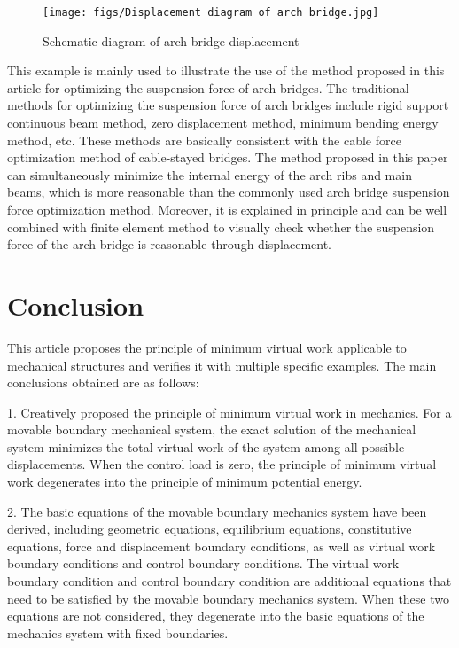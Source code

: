 \begin{figure}[h!] %
    \centering
    \texttt{[image: figs/Displacement diagram of arch bridge.jpg]} 
    \caption{Schematic diagram of arch bridge displacement}
    \label{fig:number}
\end{figure}
This example is mainly used to illustrate the use of the method proposed in this article for optimizing the suspension force of arch bridges. The traditional methods for optimizing the suspension force of arch bridges include rigid support continuous beam method, zero displacement method, minimum bending energy method, etc. These methods are basically consistent with the cable force optimization method of cable-stayed bridges. The method proposed in this paper can simultaneously minimize the internal energy of the arch ribs and main beams, which is more reasonable than the commonly used arch bridge suspension force optimization method. Moreover, it is explained in principle and can be well combined with finite element method to visually check whether the suspension force of the arch bridge is reasonable through displacement.

\section {Conclusion}
This article proposes the principle of minimum virtual work applicable to mechanical structures and verifies it with multiple specific examples. The main conclusions obtained are as follows:

1. Creatively proposed the principle of minimum virtual work in mechanics. For a movable boundary mechanical system, the exact solution of the mechanical system minimizes the total virtual work of the system among all possible displacements. When the control load  is zero, the principle of minimum virtual work degenerates into the principle of minimum potential energy.

2. The basic equations of the movable boundary mechanics system have been derived, including geometric equations, equilibrium equations, constitutive equations, force and displacement boundary conditions, as well as virtual work boundary conditions and control boundary conditions. The virtual work boundary condition and control boundary condition are additional equations that need to be satisfied by the movable boundary mechanics system. When these two equations are not considered, they degenerate into the basic equations of the mechanics system with fixed boundaries.

